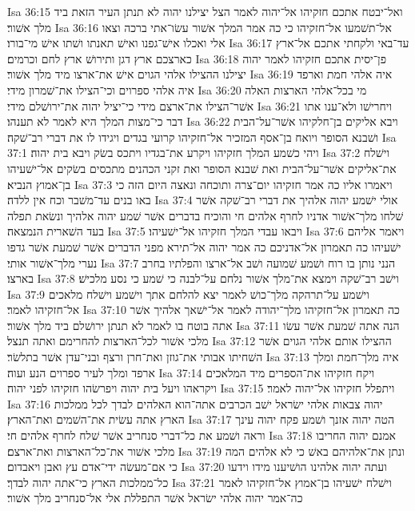 Isa 36:15  ואל־יבטח אתכם חזקיהו אל־יהוה לאמר הצל יצילנו יהוה לא תנתן העיר הזאת ביד מלך אשׁור׃
Isa 36:16  אל־תשׁמעו אל־חזקיהו כי כה אמר המלך אשׁור עשׂו־אתי ברכה וצאו אלי ואכלו אישׁ־גפנו ואישׁ תאנתו ושׁתו אישׁ מי־בורו׃
Isa 36:17  עד־באי ולקחתי אתכם אל־ארץ כארצכם ארץ דגן ותירושׁ ארץ לחם וכרמים׃
Isa 36:18  פן־יסית אתכם חזקיהו לאמר יהוה יצילנו ההצילו אלהי הגוים אישׁ את־ארצו מיד מלך אשׁור׃
Isa 36:19  איה אלהי חמת וארפד איה אלהי ספרוים וכי־הצילו את־שׁמרון מידי׃
Isa 36:20  מי בכל־אלהי הארצות האלה אשׁר־הצילו את־ארצם מידי כי־יציל יהוה את־ירושׁלם מידי׃
Isa 36:21  ויחרישׁו ולא־ענו אתו דבר כי־מצות המלך היא לאמר לא תענהו׃
Isa 36:22  ויבא אליקים בן־חלקיהו אשׁר־על־הבית ושׁבנא הסופר ויואח בן־אסף המזכיר אל־חזקיהו קרועי בגדים ויגידו לו את דברי רב־שׁקה׃
Isa 37:1  ויהי כשׁמע המלך חזקיהו ויקרע את־בגדיו ויתכס בשׂק ויבא בית יהוה׃
Isa 37:2  וישׁלח את־אליקים אשׁר־על־הבית ואת שׁבנא הסופר ואת זקני הכהנים מתכסים בשׂקים אל־ישׁעיהו בן־אמוץ הנביא׃
Isa 37:3  ויאמרו אליו כה אמר חזקיהו יום־צרה ותוכחה ונאצה היום הזה כי באו בנים עד־משׁבר וכח אין ללדה׃
Isa 37:4  אולי ישׁמע יהוה אלהיך את דברי רב־שׁקה אשׁר שׁלחו מלך־אשׁור אדניו לחרף אלהים חי והוכיח בדברים אשׁר שׁמע יהוה אלהיך ונשׂאת תפלה בעד השׁארית הנמצאה׃
Isa 37:5  ויבאו עבדי המלך חזקיהו אל־ישׁעיהו׃
Isa 37:6  ויאמר אליהם ישׁעיהו כה תאמרון אל־אדניכם כה אמר יהוה אל־תירא מפני הדברים אשׁר שׁמעת אשׁר גדפו נערי מלך־אשׁור אותי׃
Isa 37:7  הנני נותן בו רוח ושׁמע שׁמועה ושׁב אל־ארצו והפלתיו בחרב בארצו׃
Isa 37:8  וישׁב רב־שׁקה וימצא את־מלך אשׁור נלחם על־לבנה כי שׁמע כי נסע מלכישׁ׃
Isa 37:9  וישׁמע על־תרהקה מלך־כושׁ לאמר יצא להלחם אתך וישׁמע וישׁלח מלאכים אל־חזקיהו לאמר׃
Isa 37:10  כה תאמרון אל־חזקיהו מלך־יהודה לאמר אל־ישׁאך אלהיך אשׁר אתה בוטח בו לאמר לא תנתן ירושׁלם ביד מלך אשׁור׃
Isa 37:11  הנה אתה שׁמעת אשׁר עשׂו מלכי אשׁור לכל־הארצות להחרימם ואתה תנצל׃
Isa 37:12  ההצילו אותם אלהי הגוים אשׁר השׁחיתו אבותי את־גוזן ואת־חרן ורצף ובני־עדן אשׁר בתלשׂר׃
Isa 37:13  איה מלך־חמת ומלך ארפד ומלך לעיר ספרוים הנע ועוה׃
Isa 37:14  ויקח חזקיהו את־הספרים מיד המלאכים ויקראהו ויעל בית יהוה ויפרשׂהו חזקיהו לפני יהוה׃
Isa 37:15  ויתפלל חזקיהו אל־יהוה לאמר׃
Isa 37:16  יהוה צבאות אלהי ישׂראל ישׁב הכרבים אתה־הוא האלהים לבדך לכל ממלכות הארץ אתה עשׂית את־השׁמים ואת־הארץ׃
Isa 37:17  הטה יהוה אזנך ושׁמע פקח יהוה עינך וראה ושׁמע את כל־דברי סנחריב אשׁר שׁלח לחרף אלהים חי׃
Isa 37:18  אמנם יהוה החריבו מלכי אשׁור את־כל־הארצות ואת־ארצם׃
Isa 37:19  ונתן את־אלהיהם באשׁ כי לא אלהים המה כי אם־מעשׂה ידי־אדם עץ ואבן ויאבדום׃
Isa 37:20  ועתה יהוה אלהינו הושׁיענו מידו וידעו כל־ממלכות הארץ כי־אתה יהוה לבדך׃
Isa 37:21  וישׁלח ישׁעיהו בן־אמוץ אל־חזקיהו לאמר כה־אמר יהוה אלהי ישׂראל אשׁר התפללת אלי אל־סנחריב מלך אשׁור׃
